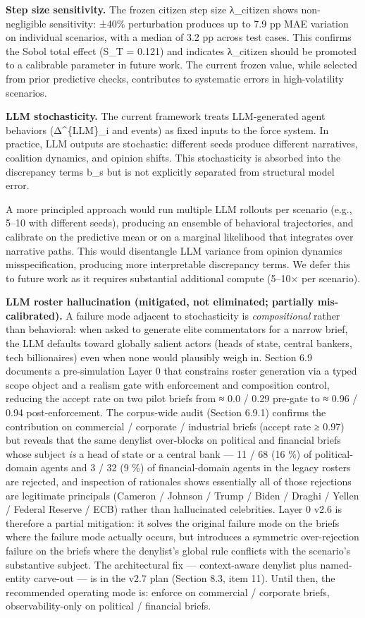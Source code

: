 \documentclass[
]{article}
\begin{document}
\textbf{Step size sensitivity.} The frozen citizen step size λ\_citizen
shows non-negligible sensitivity: ±40\% perturbation produces up to 7.9
pp MAE variation on individual scenarios, with a median of 3.2 pp across
test cases. This confirms the Sobol total effect (S\_T = 0.121) and
indicates λ\_citizen should be promoted to a calibrable parameter in
future work. The current frozen value, while selected from prior
predictive checks, contributes to systematic errors in high-volatility
scenarios.

\textbf{LLM stochasticity.} The current framework treats LLM-generated
agent behaviors (Δ\^{}\{LLM\}\_i and events) as fixed inputs to the
force system. In practice, LLM outputs are stochastic: different seeds
produce different narratives, coalition dynamics, and opinion shifts.
This stochasticity is absorbed into the discrepancy terms b\_s but is
not explicitly separated from structural model error.

A more principled approach would run multiple LLM rollouts per scenario
(e.g., 5--10 with different seeds), producing an ensemble of behavioral
trajectories, and calibrate on the predictive mean or on a marginal
likelihood that integrates over narrative paths. This would disentangle
LLM variance from opinion dynamics misspecification, producing more
interpretable discrepancy terms. We defer this to future work as it
requires substantial additional compute (5--10× per scenario).

\textbf{LLM roster hallucination (mitigated, not eliminated; partially
mis-calibrated).} A failure mode adjacent to stochasticity is
\emph{compositional} rather than behavioral: when asked to generate
elite commentators for a narrow brief, the LLM defaults toward globally
salient actors (heads of state, central bankers, tech billionaires) even
when none would plausibly weigh in. Section 6.9 documents a
pre-simulation Layer 0 that constrains roster generation via a typed
scope object and a realism gate with enforcement and composition
control, reducing the accept rate on two pilot briefs from ≈ 0.0 / 0.29
pre-gate to ≈ 0.96 / 0.94 post-enforcement. The corpus-wide audit
(Section 6.9.1) confirms the contribution on commercial / corporate /
industrial briefs (accept rate ≥ 0.97) but reveals that the same
denylist over-blocks on political and financial briefs whose subject
\emph{is} a head of state or a central bank --- 11 / 68 (16 \%) of
political-domain agents and 3 / 32 (9 \%) of financial-domain agents in
the legacy rosters are rejected, and inspection of rationales shows
essentially all of those rejections are legitimate principals (Cameron /
Johnson / Trump / Biden / Draghi / Yellen / Federal Reserve / ECB)
rather than hallucinated celebrities. Layer 0 v2.6 is therefore a
partial mitigation: it solves the original failure mode on the briefs
where the failure mode actually occurs, but introduces a symmetric
over-rejection failure on the briefs where the denylist's global rule
conflicts with the scenario's substantive subject. The architectural fix
--- context-aware denylist plus named-entity carve-out --- is in the
v2.7 plan (Section 8.3, item 11). Until then, the recommended operating
mode is: enforce on commercial / corporate briefs, observability-only on
political / financial briefs.
\end{document}
